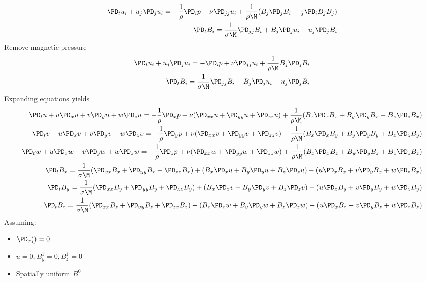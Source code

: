 \documentclass[11pt]{article}
\begin{document}
\begin{equation}\begin{aligned}
\PD_t u_i+u_j\PD_j u_i = - \frac{1}{\rho} \PD_i p+ \nu \PD_{jj} u_i + \frac{1}{\rho \M} (B_j \PD_j B_i - \tfrac{1}{2} \PD_i B_j B_j) \\
\PD_t B_i = \frac{1}{\sigma \M} \PD_{jj} B_i + B_j \PD_j u_i - u_j \PD_j B_i
\end{aligned} \end{equation}
Remove magnetic pressure
\begin{equation}\begin{aligned}
\PD_t u_i+u_j\PD_j u_i = -\PD_i p+ \nu \PD_{jj} u_i + \frac{1}{\rho \M} B_j \PD_j B_i \\
\PD_t B_i = \frac{1}{\sigma \M} \PD_{jj} B_i + B_j \PD_j u_i - u_j \PD_j B_i
\end{aligned} \end{equation}
Expanding equations yields
\begin{equation}\begin{aligned}
\PD_t u+ u\PD_x u + v\PD_y u + w\PD_z u = -\frac{1}{\rho}\PD_x p+ \nu (\PD_{xx} u+\PD_{yy} u+\PD_{zz} u) + \frac{1}{\rho \M} (B_x \PD_x B_x + B_y \PD_y B_x + B_z \PD_z B_x) \\
\PD_t v+ u\PD_x v + v\PD_y v + w\PD_z v = -\frac{1}{\rho}\PD_y p+ \nu (\PD_{xx} v+\PD_{yy} v+\PD_{zz} v) + \frac{1}{\rho \M} (B_x \PD_x B_y + B_y \PD_y B_y + B_z \PD_z B_y) \\
\PD_t w+ u\PD_x w + v\PD_y w + w\PD_z w = -\frac{1}{\rho}\PD_z p+ \nu (\PD_{xx} w+\PD_{yy} w+\PD_{zz} w) + \frac{1}{\rho \M} (B_x \PD_x B_z + B_y \PD_y B_z + B_z \PD_z B_z) \\
\PD_t B_x = \frac{1}{\sigma \M} (\PD_{xx} B_x + \PD_{yy} B_x+\PD_{zz} B_x) + (B_x\PD_x u+B_y\PD_y u+B_z\PD_z u) - (u\PD_x B_x+v\PD_y B_x+w\PD_z B_x) \\
\PD_t B_y = \frac{1}{\sigma \M} (\PD_{xx} B_y + \PD_{yy} B_y+\PD_{zz} B_y) + (B_x\PD_x v+B_y\PD_y v+B_z\PD_z v) - (u\PD_x B_y+v\PD_y B_y+w\PD_z B_y) \\
\PD_t B_z = \frac{1}{\sigma \M} (\PD_{xx} B_z + \PD_{yy} B_z+\PD_{zz} B_z) + (B_x\PD_x w+B_y\PD_y w+B_z\PD_z w) - (u\PD_x B_z+v\PD_y B_z+w\PD_z B_z) \\
\end{aligned} \end{equation}
Assuming:
\begin{itemize}
\item $\PD_x () = 0$
\item $u = 0,B_y^1=0,B_z^1=0$
\item Spatially uniform $B^0$
\end{itemize}
\end{document}
